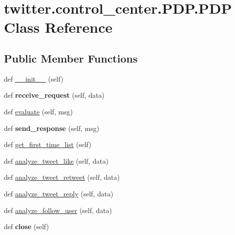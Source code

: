 \hypertarget{classtwitter_1_1control__center_1_1PDP_1_1PDP}{}\section{twitter.\+control\+\_\+center.\+P\+D\+P.\+P\+DP Class Reference}
\label{classtwitter_1_1control__center_1_1PDP_1_1PDP}
\subsection*{Public Member Functions}
\begin{DoxyCompactItemize}
\item 
def \hyperlink{classtwitter_1_1control__center_1_1PDP_1_1PDP_adf406e4b2ad47c65c563ccc7eccaf871}{\+\_\+\+\_\+init\+\_\+\+\_\+} (self)
\item 
\mbox{\label{classtwitter_1_1control__center_1_1PDP_1_1PDP_af72d3a9d5544d71cf6d96369e79d0d37}} 
def {\bfseries receive\+\_\+request} (self, data)
\item 
def \hyperlink{classtwitter_1_1control__center_1_1PDP_1_1PDP_ad40264a760a1bdcb7563cb71955bb7f9}{evaluate} (self, msg)
\item 
\mbox{\label{classtwitter_1_1control__center_1_1PDP_1_1PDP_ae0c0a77717da7489004c0b34b9fec771}} 
def {\bfseries send\+\_\+response} (self, msg)
\item 
def \hyperlink{classtwitter_1_1control__center_1_1PDP_1_1PDP_a5ac3bf5edb6f1913f09aecf0fe1ccc7f}{get\+\_\+first\+\_\+time\+\_\+list} (self)
\item 
def \hyperlink{classtwitter_1_1control__center_1_1PDP_1_1PDP_af6e05300883ddb19bcd9c6047e000ec1}{analyze\+\_\+tweet\+\_\+like} (self, data)
\item 
def \hyperlink{classtwitter_1_1control__center_1_1PDP_1_1PDP_ae173efc2c97b103ad0fbb0484c27835a}{analyze\+\_\+tweet\+\_\+retweet} (self, data)
\item 
def \hyperlink{classtwitter_1_1control__center_1_1PDP_1_1PDP_acbac2033b2853b89b3ee19ed040586e8}{analyze\+\_\+tweet\+\_\+reply} (self, data)
\item 
def \hyperlink{classtwitter_1_1control__center_1_1PDP_1_1PDP_ab9d69b04d93fc8b6fead61fd98991c22}{analyze\+\_\+follow\+\_\+user} (self, data)
\item 
\mbox{\label{classtwitter_1_1control__center_1_1PDP_1_1PDP_ac3d2ce5166ecab928b14d231b322523f}} 
def {\bfseries close} (self)
\end{DoxyCompactItemize}
